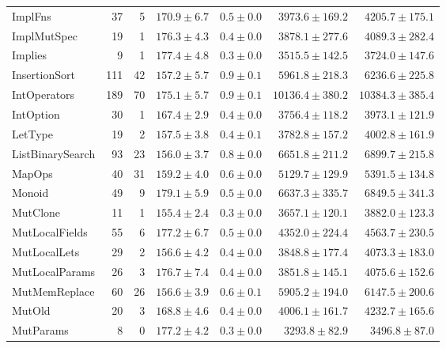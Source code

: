 \begin{table}
\begin{tabular}{lrrrrrr}
ImplFns                  &   37 &    5 &      $170.9\pm6.7$ &  $0.5\pm0.0$ &   $3973.6\pm169.2$ &   $4205.7\pm175.1$ \\
ImplMutSpec              &   19 &    1 &      $176.3\pm4.3$ &  $0.4\pm0.0$ &   $3878.1\pm277.6$ &   $4089.3\pm282.4$ \\
Implies                  &    9 &    1 &      $177.4\pm4.8$ &  $0.3\pm0.0$ &   $3515.5\pm142.5$ &   $3724.0\pm147.6$ \\
InsertionSort            &  111 &   42 &      $157.2\pm5.7$ &  $0.9\pm0.1$ &   $5961.8\pm218.3$ &   $6236.6\pm225.8$ \\
IntOperators             &  189 &   70 &      $175.1\pm5.7$ &  $0.9\pm0.1$ &  $10136.4\pm380.2$ &  $10384.3\pm385.4$ \\
IntOption                &   30 &    1 &      $167.4\pm2.9$ &  $0.4\pm0.0$ &   $3756.4\pm118.2$ &   $3973.1\pm121.9$ \\
LetType                  &   19 &    2 &      $157.5\pm3.8$ &  $0.4\pm0.1$ &   $3782.8\pm157.2$ &   $4002.8\pm161.9$ \\
ListBinarySearch         &   93 &   23 &      $156.0\pm3.7$ &  $0.8\pm0.0$ &   $6651.8\pm211.2$ &   $6899.7\pm215.8$ \\
MapOps                   &   40 &   31 &      $159.2\pm4.0$ &  $0.6\pm0.0$ &   $5129.7\pm129.9$ &   $5391.5\pm134.8$ \\
Monoid                   &   49 &    9 &      $179.1\pm5.9$ &  $0.5\pm0.0$ &   $6637.3\pm335.7$ &   $6849.5\pm341.3$ \\
MutClone                 &   11 &    1 &      $155.4\pm2.4$ &  $0.3\pm0.0$ &   $3657.1\pm120.1$ &   $3882.0\pm123.3$ \\
MutLocalFields           &   55 &    6 &      $177.2\pm6.7$ &  $0.5\pm0.0$ &   $4352.0\pm224.4$ &   $4563.7\pm230.5$ \\
MutLocalLets             &   29 &    2 &      $156.6\pm4.2$ &  $0.4\pm0.0$ &   $3848.8\pm177.4$ &   $4073.3\pm183.0$ \\
MutLocalParams           &   26 &    3 &      $176.7\pm7.4$ &  $0.4\pm0.0$ &   $3851.8\pm145.1$ &   $4075.6\pm152.6$ \\
MutMemReplace            &   60 &   26 &      $156.6\pm3.9$ &  $0.6\pm0.1$ &   $5905.2\pm194.0$ &   $6147.5\pm200.6$ \\
MutOld                   &   20 &    3 &      $168.8\pm4.6$ &  $0.4\pm0.0$ &   $4006.1\pm161.7$ &   $4232.7\pm165.6$ \\
MutParams                &    8 &    0 &      $177.2\pm4.2$ &  $0.3\pm0.0$ &    $3293.8\pm82.9$ &    $3496.8\pm87.0$ \\

\end{tabular}
\end{table}

